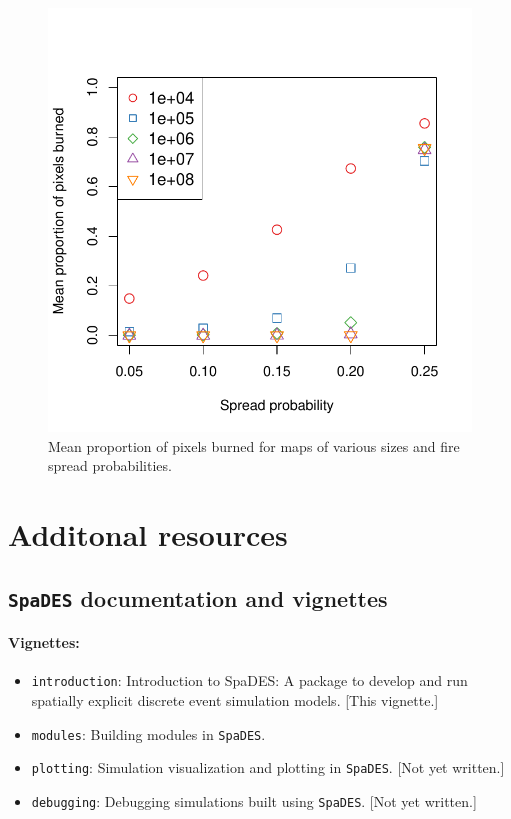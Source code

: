 \documentclass{article}
\begin{document}
\begin{figure}[!htbp]
  \centering
  \includegraphics[width=5in]{../inst/plot-area-burned.pdf}
	\caption{Mean proportion of pixels burned for maps of various sizes and fire spread probabilities.}
	\label{figure-area-burned}
\end{figure}

\newpage

\section{Additonal resources}

\subsection{\texttt{SpaDES} documentation and vignettes}

\paragraph{Vignettes:}

\begin{itemize}
  \item \texttt{introduction}: Introduction to SpaDES: A package to develop and run spatially explicit discrete event simulation models. [This vignette.]
  \item \texttt{modules}: Building modules in \texttt{SpaDES}.
  \item \texttt{plotting}: Simulation visualization and plotting in \texttt{SpaDES}. [Not yet written.]
  \item \texttt{debugging}: Debugging simulations built using \texttt{SpaDES}. [Not yet written.]
\end{itemize}
\end{document}
